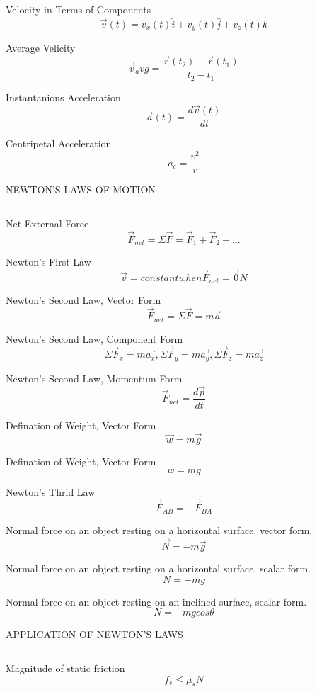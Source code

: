 \documentclass[12pt, letterpaper, twoside]{article}
\begin{document}
Velocity in Terms of Components
$$\overrightarrow{v}(t) = v_x(t) \hat{i} + v_y(t) \hat{j} + v_z(t) \hat{k}$$


Average Velicity
$$\overrightarrow{v}_avg = \frac{\overrightarrow{r}(t_2) -  \overrightarrow{r}(t_1)}{t_2 - t_1}$$


Instantanious Acceleration
$$\overrightarrow{a}(t)= \frac{d \overrightarrow{v}(t)}{dt}$$


Centripetal Acceleration
$$a_c = \frac{v^2}{r}$$



\newpage

NEWTON'S LAWS OF MOTION

$$ $$


Net External Force
$$\overrightarrow{F}_{net} = \Sigma \overrightarrow{F} = \overrightarrow{F}_1+\overrightarrow{F}_2 +...$$


Newton's First Law
$$\overrightarrow{v} = constant when \overrightarrow{F}_{net} = \overrightarrow{0} N$$


Newton's Second Law, Vector Form
$$\overrightarrow{F}_{net} = \Sigma \overrightarrow{F} = m \overrightarrow{a}$$


Newton's Second Law, Component Form
$$\Sigma \overrightarrow{F}_x = m \overrightarrow{a_x}, \Sigma \overrightarrow{F}_y = m \overrightarrow{a_y},\Sigma \overrightarrow{F}_z = m \overrightarrow{a_z}$$



Newton's Second Law, Momentum Form
$$\overrightarrow{F}_{net} = \frac{d \overrightarrow{p}}{dt}$$


Defination of Weight, Vector Form
$$\overrightarrow{w} = m \overrightarrow{g}$$


Defination of Weight, Vector Form
$$w = mg$$


Newton's Thrid Law
$$\overrightarrow{F}_{AB} = - \overrightarrow{F}_{BA}$$

Normal force on an object resting on a horizontal surface,
vector form.
$$\overrightarrow{N} = -m \overrightarrow{g}$$

Normal force on an object resting on a horizontal surface,
scalar form.
$$N = -mg$$

Normal force on an object resting on an inclined surface,
scalar form.
$$N = -m g cos \theta$$



\newpage

APPLICATION OF NEWTON'S LAWS

$$ $$

Magnitude of static friction
$$f_s \leq \mu_s N$$
\end{document}
